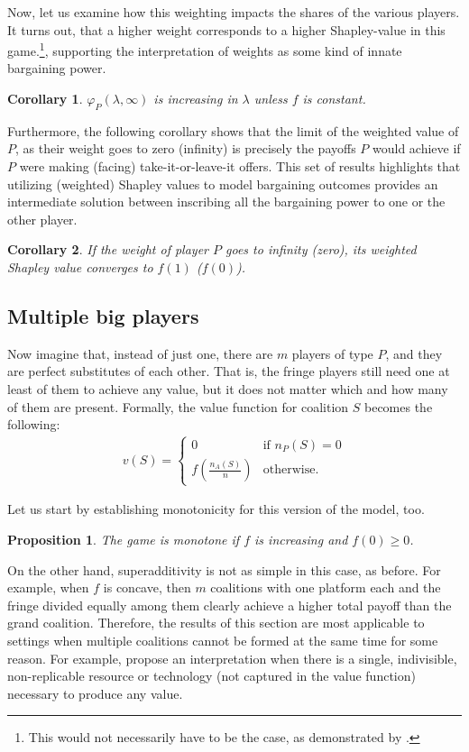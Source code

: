 \documentclass[a4paper]{article}
\newtheorem{proposition}{Proposition}
\newtheorem{corollary}{Corollary}
\begin{document}
Now, let us examine how this weighting impacts the shares of the various players.
It turns out, that a higher weight corresponds to a higher Shapley-value in this game.\footnote{
    This would not necessarily have to be the case, as demonstrated by \textcite{owen1968communications}.
},
supporting the interpretation of weights as some kind of innate bargaining power.
\begin{corollary}
    \label{cor:platform_value_weighted}
    $\varphi_P(\lambda, \infty)$ is increasing in $\lambda$ unless $f$ is constant.
\end{corollary}

Furthermore, the following corollary shows that the limit of the weighted value of $P$, as their weight goes to zero (infinity) is precisely the payoffs $P$ would achieve if $P$ were making (facing) take-it-or-leave-it offers.
This set of results highlights that utilizing (weighted) Shapley values to model bargaining outcomes provides an intermediate solution between inscribing all the bargaining power to one or the other player.
\begin{corollary}
    \label{cor:paltform_value_weighted_2}
    If the weight of player $P$ goes to infinity (zero), its weighted Shapley value converges to $f(1)$ ($f(0)$).
\end{corollary}

\subsection{Multiple big players}

Now imagine that, instead of just one, there are $m$ players of type $P$, and they are perfect substitutes of each other.
That is, the fringe players still need one at least of them to achieve any value, but it does not matter which and how many of them are present.
Formally, the value function for coalition $S$ becomes the following:
\begin{align*}
    v(S) = \begin{cases}
        0                              & \text{if } n_P(S) = 0 \\
        f\left(\frac{n_A(S)}{n}\right) & \text{otherwise}.
    \end{cases}
\end{align*}

Let us start by establishing monotonicity for this version of the model, too.
\begin{proposition}
    The game is monotone if $f$ is increasing and $f(0) \geq 0$.
\end{proposition}
On the other hand, superadditivity is not as simple in this case, as before.
For example, when $f$ is concave, then $m$ coalitions with one platform each and the fringe divided equally among them clearly achieve a higher total payoff than the grand coalition.
Therefore, the results of this section are most applicable to settings when multiple coalitions cannot be formed at the same time for some reason.
For example, \textcite{hart1996bargaining} propose an interpretation when there is a single, indivisible, non-replicable resource or technology (not captured in the value function) necessary to produce any value.
\end{document}
